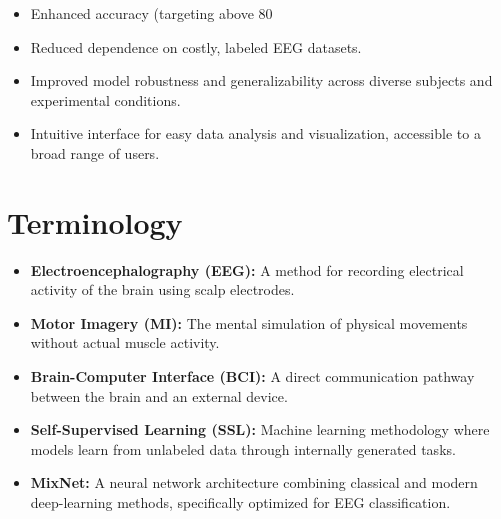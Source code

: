 \begin{itemize}

    \item Enhanced accuracy (targeting above 80%

    \item Reduced dependence on costly, labeled EEG datasets.

    \item Improved model robustness and generalizability across diverse subjects and experimental conditions.

    \item Intuitive interface for easy data analysis and visualization, accessible to a broad range of users.

\end{itemize}


\section{Terminology}
\label{section:terminology}


\begin{itemize}

    \item \textbf{Electroencephalography (EEG):} A method for recording electrical activity of the brain using scalp electrodes.

    \item \textbf{Motor Imagery (MI):} The mental simulation of physical movements without actual muscle activity.

    \item \textbf{Brain-Computer Interface (BCI):} A direct communication pathway between the brain and an external device.

    \item \textbf{Self-Supervised Learning (SSL):} Machine learning methodology where models learn from unlabeled data through internally generated tasks.

    \item \textbf{MixNet:} A neural network architecture combining classical and modern deep-learning methods, specifically optimized for EEG classification.

\end{itemize}
